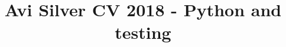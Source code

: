 \documentclass[localFont,alternative]{yaac-another-awesome-cv}
\title{Avi Silver CV 2018 - Python and testing}
\begin{document}
\makecvheader


\end{document}
